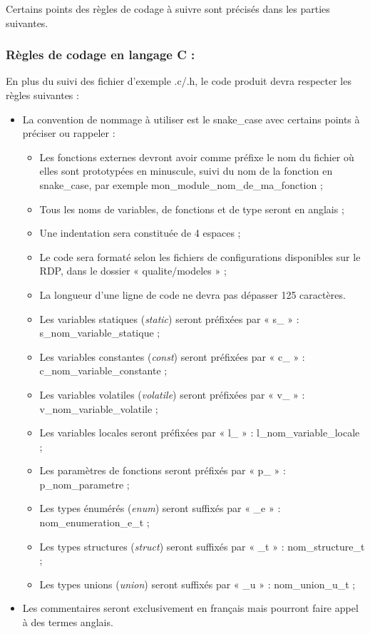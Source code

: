 \documentclass[a4paper,11pt,titlepage]{article}
\begin{document}
Certains points des règles de codage à suivre sont précisés dans les parties suivantes.\\

\subsubsection{Règles de codage en langage C :}
En plus du suivi des fichier d'exemple .c/.h, le code produit devra respecter les règles suivantes :
\begin{itemize}
  \item La convention de nommage à utiliser est le snake\_case avec certains points à préciser ou rappeler :
        \begin{itemize}
            \item Les fonctions externes devront avoir comme préfixe le nom du fichier où elles sont prototypées en minuscule, suivi 
            du nom de la fonction en snake\_case, par exemple mon\_module\_nom\_de\_ma\_fonction ;
            \item Tous les noms de variables, de fonctions et de type seront en anglais ;
            \item Une indentation sera constituée de 4 espaces ;
            \item Le code sera formaté selon les fichiers de configurations disponibles sur le RDP, dans le dossier « qualite/modeles » ;
            \item La longueur d'une ligne de code ne devra pas dépasser 125 caractères.
            \item Les variables statiques (\emph{static}) seront préfixées par « s\_ » : s\_nom\_variable\_statique ;
            \item Les variables constantes (\emph{const}) seront préfixées par « c\_ » : c\_nom\_variable\_constante ;
            \item Les variables volatiles (\emph{volatile}) seront préfixées par « v\_ » : v\_nom\_variable\_volatile ;
            \item Les variables locales seront préfixées par « l\_ » : l\_nom\_variable\_locale ;
            \item Les paramètres de fonctions seront préfixés par « p\_ » : p\_nom\_parametre ;
            \item Les types énumérés (\emph{enum}) seront suffixés par « \_e » : nom\_enumeration\_e\_t ;
            \item Les types structures (\emph{struct}) seront suffixés par « \_t » : nom\_structure\_t ;
            \item Les types unions (\emph{union}) seront suffixés par « \_u » : nom\_union\_u\_t ;
        \end{itemize}
  \item Les commentaires seront exclusivement en français mais pourront faire appel à des termes anglais.
\end{itemize}
\end{document}
